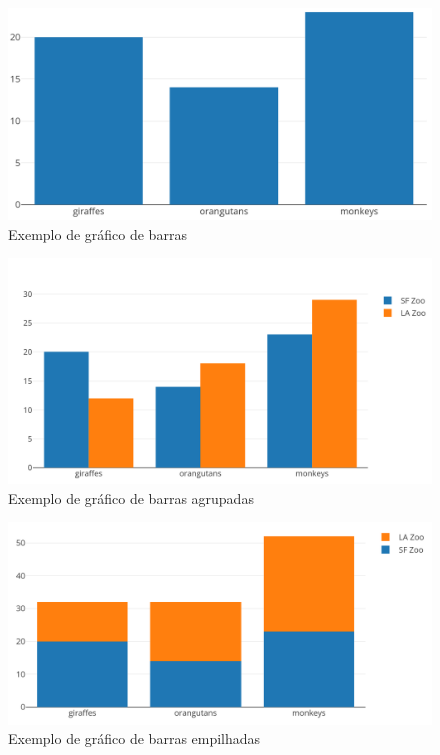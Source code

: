 \begin{figure}[H]
\centering
\includegraphics[max width=12cm, keepaspectratio]{./img/barras1}
\caption{Exemplo de gráfico de barras}
\end{figure}
\noindent

\begin{figure}[H]
\centering
\includegraphics[max width=12cm, keepaspectratio]{./img/agrupada}
\caption{Exemplo de gráfico de barras agrupadas}
\end{figure}
\noindent

\begin{figure}[H]
\centering
\includegraphics[max width=12cm, keepaspectratio]{./img/empilhada}
\caption{Exemplo de gráfico de barras empilhadas}
\end{figure}
\noindent

